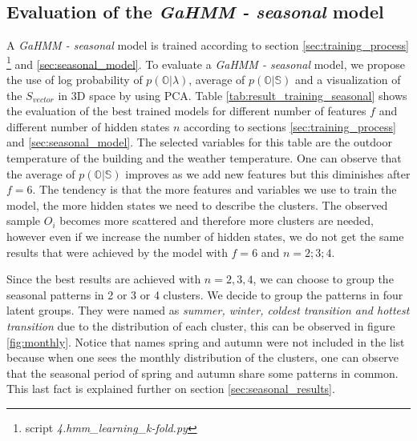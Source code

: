 \subsection{Evaluation of the \textit{GaHMM - seasonal} model}
\label{sec:seasonal_evaluation}


A \textit{GaHMM - seasonal} model is trained according to section \ref{sec:training_process} \footnote{script \textit{4.hmm\_learning\_k-fold.py}}  and \ref{sec:seasonal_model}. To evaluate a \textit{GaHMM - seasonal} model, we propose the use of log probability of $ p(\mathbb{O}|\lambda)$, average of $p(\mathbb{O}|\mathbb{S})$ and a visualization of the $S_{vector}$ in 3D space by using PCA. Table \ref{tab:result_training_seasonal} shows the evaluation of the best trained models for different number of features $ f $ and different number of hidden states $n$ according to sections \ref{sec:training_process} and \ref{sec:seasonal_model}. The selected variables for this table are the outdoor temperature of the building and the weather temperature. One can observe that the average of $p(\mathbb{O}|\mathbb{S})$ improves as we add new features but this diminishes after $f = 6$. The tendency is that the more features and variables we use to train the model, the more hidden states we need to describe the clusters. The observed sample $O_i$ becomes more scattered and therefore more clusters are needed, however even if we increase the number of hidden states, we do not get the same results that were achieved by the model with $f = 6$ and
$n = 2; 3; 4$.

Since the best results are achieved with $n=2,3,4$, we can choose to group the seasonal patterns in 2 or 3 or 4 clusters. We decide to group the patterns in four latent groups. They were named as \textit{summer, winter, coldest transition and hottest transition} due to the distribution of each cluster, this can be observed in figure \ref{fig:monthly}. Notice that names spring and autumn were not included in the list because when one sees the monthly distribution of the clusters, one can observe that the seasonal period of spring and autumn share some patterns in common. This last fact is explained further on section \ref{sec:seasonal_results}. 




